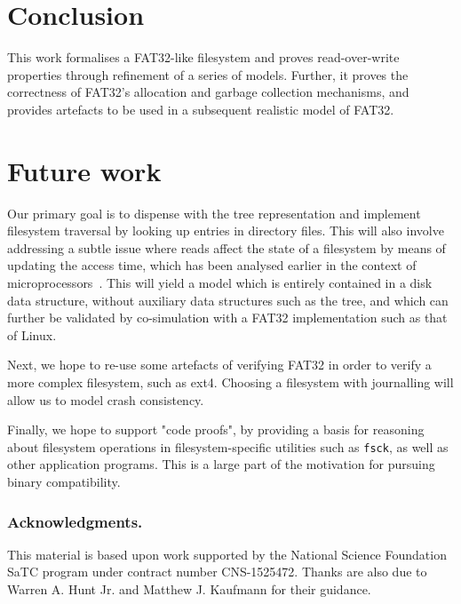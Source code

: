 \documentclass[runningheads,a4paper]{llncs}
\begin{document}
\section{Conclusion}

This work formalises a FAT32-like filesystem and proves
read-over-write properties through refinement of a series of
models. Further, it proves the correctness of FAT32's allocation and
garbage collection mechanisms, and provides artefacts to be used in a
subsequent realistic model of FAT32.

\section{Future work}

Our primary goal is to dispense with the tree representation and
implement filesystem traversal by looking up entries in directory
files. This will also involve addressing a subtle issue where reads
affect the state of a filesystem by means of updating the access time,
which has been analysed earlier in the context of
microprocessors~\cite{goel2017engineering}. This will yield a model
which is entirely contained in a disk data structure, without
auxiliary data structures such as the tree, and which can
further be validated by co-simulation with a FAT32 implementation such
as that of Linux.

Next, we hope to re-use some artefacts of verifying FAT32 in order to
verify a more complex filesystem, such as ext4. Choosing a filesystem
with journalling will allow us to model crash consistency.

Finally, we hope to support "code proofs", by providing a basis for
reasoning about filesystem operations in filesystem-specific utilities
such as \texttt{fsck}, as well as other application programs. This is
a large part of the motivation for pursuing binary compatibility.

\subsubsection*{Acknowledgments.} This material is based upon work
supported by the National Science Foundation SaTC program under
contract number CNS-1525472. Thanks are also due to Warren A. Hunt
Jr. and Matthew J. Kaufmann for their guidance.



\end{document}
